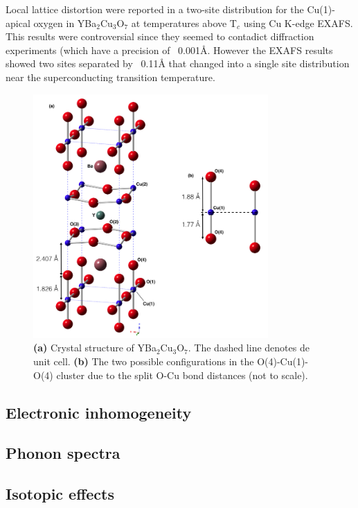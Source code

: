 Local lattice distortion were reported in a two-site distribution for the Cu(1)-apical oxygen in YBa$_{2}$Cu$_{3}$O$_{7}$  at temperatures above T$_{c}$ using Cu K-edge EXAFS\cite{MustredeLeon1990, Conradson1990}. This results were controversial\cite{Kwei1990} since they seemed to contadict diffraction experiments (which have a precision of ~0.001Å\cite{Miceli1988}. However the EXAFS results showed two sites separated by ~0.11Å that changed into a single site distribution near the superconducting transition temperature.

\begin{figure}[ht!]
\centering
\includegraphics[width=0.8\textwidth]{images/YBCO_O-Cu-Ov2.jpg}
\caption{\textbf{(a)} Crystal structure of YBa$_{2}$Cu$_{3}$O$_{7}$. The dashed line denotes de unit cell. \textbf{(b)} The two possible configurations in the O(4)-Cu(1)-O(4) cluster due to the split O-Cu bond distances (not to scale).
}
\label{fig:YBCO_structure}
\end{figure}


\subsection{Electronic inhomogeneity}
\subsection{Phonon spectra}
\subsection{Isotopic effects}

